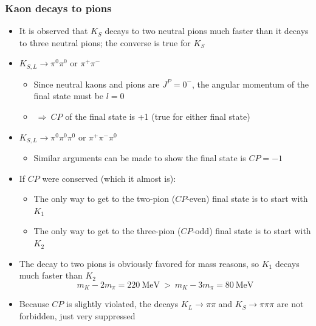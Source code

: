 \documentclass[11pt]{article}
\newcommand{\mev}{\text{MeV}}
\newcommand{\CP}{\ensuremath{CP}\xspace}
\newcommand{\thus}{\ensuremath{~\Rightarrow~}}
\begin{document}
  \subsubsection{Kaon decays to pions}
  \begin{itemize}
    \item It is observed that $K_S$ decays to two neutral pions much faster than it decays to three neutral pions; the converse is true for $K_S$
    \item $K_{S,L}\rightarrow \pi^0\pi^0$ or $\pi^+\pi^-$
    \begin{itemize}
      \item Since neutral kaons and pions are $J^P = 0^-$, the angular momentum of the final state must be $l=0$
      \item \thus \CP of the final state is +1 (true for either final state)
    \end{itemize}
    \item $K_{S,L} \rightarrow \pi^0\pi^0\pi^0$ or $\pi^+\pi^-\pi^0$
    \begin{itemize}
      \item Similar arguments can be made to show the final state is $\CP = -1$
    \end{itemize}
    \item If \CP were conserved (which it almost is):
    \begin{itemize}
      \item The only way to get to the two-pion (\CP-even) final state is to start with $K_1$
      \item The only way to get to the three-pion (\CP-odd) final state is to start with $K_2$
    \end{itemize}
    \item The decay to two pions is obviously favored for mass reasons, so $K_1$ decays much faster than $K_2$
    \begin{equation}
      m_K - 2m_\pi = 220~\mev ~ > ~ m_K - 3m_\pi = 80~\mev
    \end{equation}
    \item Because \CP is slightly violated, the decays $K_L\rightarrow \pi\pi$ and $K_S \rightarrow \pi\pi\pi$ are not forbidden, just very suppressed
  \end{itemize}
\end{document}
